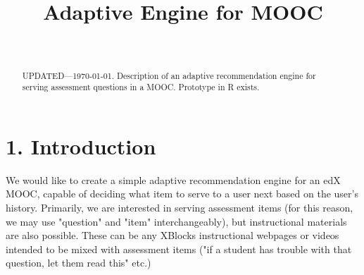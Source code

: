 \documentclass{sigchi}
\newcommand{\1}{\mathbf{1}}
\def\plaintitle{Adaptive Engine for MOOC}
\def\plainkeywords{Authors' choice; of terms; separated; by
  semicolons; include commas, within terms only; required.}
\begin{document}
\title{\plaintitle}

\author{%
  \\
}

\maketitle

\begin{abstract}
  UPDATED---\today. Description of an adaptive recommendation engine for serving assessment questions in a MOOC. Prototype in R exists.
\end{abstract}

% 

\section{1. Introduction}
\label{sec:intro}
We would like to create a simple adaptive recommendation engine for an edX MOOC, capable of deciding what item to serve to a user next based on the user's history. Primarily, we are interested in serving assessment items (for this reason, we may use "question" and "item" interchangeably), but instructional materials are also possible. These can be any XBlocks instructional webpages or videos intended to be mixed with assessment items ("if a student has trouble with that question, let them read this" etc.)
\end{document}

